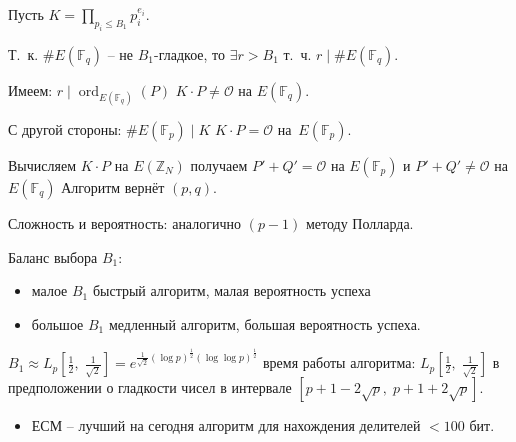 \documentclass{beamer}
\begin{document}
\begin{frame}
\ProofBegin
Пусть $ K = \prod\limits_{p_i \leq B_1} p_i^{e_i}$.

\vspace{0.5em}
Т.~к. $\#E(\mathbb{F}_q)$ -- не $B_1$-гладкое, то $\exists r > B_1$ т.~ч. $r \mid \#E(\mathbb{F}_q)$.

Имеем: $r \mid \operatorname{ord}_{E(\mathbb{F}_q)}(P)$ \MyImplies $K \cdot P \neq \mathcal{O}$ на $E(\mathbb{F}_q)$.
\vspace{0.5em}

С другой стороны: $\#E(\mathbb{F}_p) \mid K$ \MyImplies $K \cdot P = \mathcal{O}$ на~$E(\mathbb{F}_p)$.

Вычисляем $K \cdot P$ на $E(\mathbb{Z}_N)$ \MyImplies получаем $P' + Q' = \mathcal{O}$ на $E(\mathbb{F}_p)$ и $P' + Q' \neq \mathcal{O}$ на $E(\mathbb{F}_q)$ \MyImplies Алгоритм вернёт $(p, q)$.

\vspace{0.5em}
Сложность и вероятность: аналогично $(p-1)$ методу Полларда. 
\ProofEnd
\end{frame}

\begin{frame}
 Баланс выбора $B_1$:
\begin{itemize}
    \item малое $B_1$ \structure{$\Rightarrow$} быстрый алгоритм, малая вероятность успеха 
    \item большое $B_1$ \structure{$\Rightarrow$} медленный алгоритм, большая вероятность успеха. 
\end{itemize}

 ${B_1} \approx {L_p}[ \frac{1}{2},\;\frac{1}{\sqrt 2 }] = e^{\frac{1}{\sqrt 2 }(\log p)^\frac{1}{2}(\log\log p)^\frac{1}{2}}$  \structure{$\Rightarrow$} время работы алгоритма: ${L_p}[ \frac{1}{2},\;\frac{1}{\sqrt 2 }]$ в предположении о гладкости чисел в интервале 
$[ {p + 1 - 2\sqrt p ,\;p + 1 + 2\sqrt p } ]$.
\begin{itemize}
    \item ЕСМ -- лучший на сегодня алгоритм для нахождения делителей $< 100$ бит.
\end{itemize} 
\end{frame}

\end{document}

